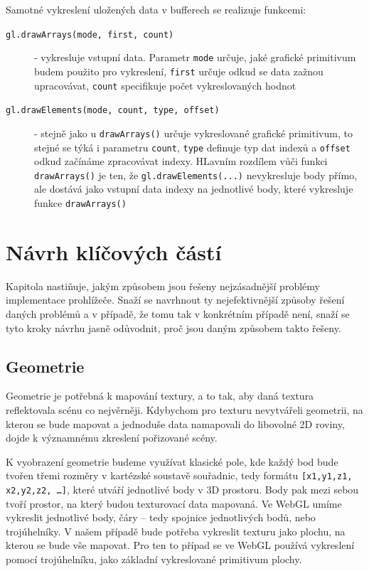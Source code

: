 Samotné vykreslení uložených data v bufferech se realizuje funkcemi:


\begin{description}
	
	\item[\texttt{gl.drawArrays(mode, first, count)}] - vykresluje vstupní data. Parametr \texttt{mode} určuje, jaké grafické primitivum budem použito pro vykreslení, \texttt{first} určuje odkud se data zažnou upracovávat, \texttt{count} specifikuje počet vykreslovaných hodnot
	
	\item[\texttt{gl.drawElements(mode, count, type, offset)}] - stejně jako u \texttt{drawArrays()} určuje vykreslované grafické primitivum, to stejné se týká i parametru \texttt{count}, \texttt{type} definuje typ dat indexů a \texttt{offset} odkud začínáme zpracovávat indexy. HLavním rozdílem vůči funkci \texttt{drawArrays()} je ten, že \texttt{gl.drawElements(...)} nevykresluje body přímo, ale dostává jako vstupní data indexy na jednotlivé body, které vykresluje funkce \texttt{drawArrays()}
	
\end{description}

\newpage



\chapter{Návrh klíčových částí}
\label{chapter:3}
Kapitola nastiňuje, jakým způsobem jsou řešeny nejzásadnější problémy implementace prohlížeče. Snaží se navrhnout ty nejefektivnější způsoby řešení daných problémů a v případě, že tomu tak v konkrétním případě není, snaží se tyto  kroky návrhu jasně odůvodnit, proč jsou  daným způsobem takto řešeny.


\section{Geometrie}
Geometrie je potřebná k mapování textury, a to tak, aby daná textura reflektovala scénu co nejvěrněji. Kdybychom pro texturu nevytvářeli geometrii, na kterou se bude mapovat a jednoduše data namapovali do libovolné 2D roviny, dojde k významnému zkreslení pořizované scény.

K vyobrazení geometrie budeme využívat klasické pole, kde každý bod bude tvořen třemi rozměry v kartézské soustavě souřadnic, tedy formátu \texttt{[x1,y1,z1, x2,y2,z2, …]}, které utváří jednotlivé body v 3D prostoru. Body pak mezi sebou tvoří prostor, na který budou texturovací data  mapovaná. Ve WebGL umíme vykreslit jednotlivé body, čáry – tedy spojnice jednotlivých bodů, nebo trojúhelníky. V našem případě bude potřeba vykreslit texturu jako plochu, na kterou se bude vše mapovat. Pro ten to případ se ve WebGL používá vykreslení pomocí trojúhelníku, jako základní vykreslované primitivum plochy.

